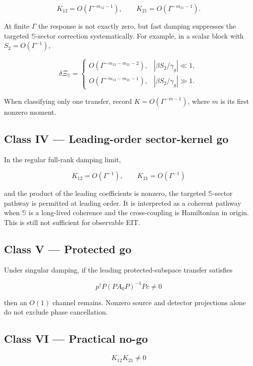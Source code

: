 \documentclass[
  10pt,
  a4paper,
]{article}
\begin{document}
\[
K_{12}=O(\Gamma^{-m_{12}-1}),
\qquad
K_{21}=O(\Gamma^{-m_{21}-1}).
\]

At finite \(\Gamma\) the response is not exactly zero, but fast damping
suppresses the targeted \(\mathbb S\)-sector correction systematically.
For example, in a scalar block with \(S_2=O(\Gamma^{-1})\),

\[
\delta\Xi_{\mathbb S}=
\begin{cases}
O(\Gamma^{-m_{12}-m_{21}-2}), & |\beta S_2/\gamma_g|\ll1,\\
O(\Gamma^{-m_{12}-m_{21}-1}), & |\beta S_2/\gamma_g|\gg1.
\end{cases}
\]

When classifying only one transfer, record \(K=O(\Gamma^{-m-1})\), where
\(m\) is its first nonzero moment.

\subsection{Class IV --- Leading-order sector-kernel
go}\label{class-iv-leading-order-sector-kernel-go}

In the regular full-rank damping limit,

\[
K_{12}=O(\Gamma^{-1}),
\qquad
K_{21}=O(\Gamma^{-1})
\]

and the product of the leading coefficients is nonzero, the targeted
\(\mathbb S\)-sector pathway is permitted at leading order. It is
interpreted as a coherent pathway when \(\mathbb S\) is a long-lived
coherence and the cross-coupling is Hamiltonian in origin. This is still
not sufficient for observable EIT.

\subsection{Class V --- Protected go}\label{class-v-protected-go}

Under singular damping, if the leading protected-subspace transfer
satisfies

\[
\boxed{
p^\dagger P(PA_0P)^{-1}Pc\neq0
}
\]

then an \(O(1)\) channel remains. Nonzero source and detector
projections alone do not exclude phase cancellation.

\subsection{Class VI --- Practical
no-go}\label{class-vi-practical-no-go}

\[
K_{12}K_{21}\neq0
\]
\end{document}
